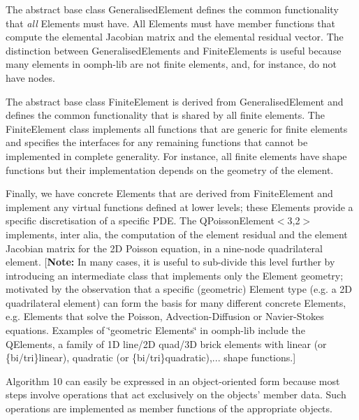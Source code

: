 \begin{DoxyItemize}
\item The abstract base class {\ttfamily Generalised\-Element} defines the common functionality that {\itshape all} Elements must have. All Elements must have member functions that compute the elemental Jacobian matrix and the elemental residual vector. The distinction between {\ttfamily Generalised\-Elements} and {\ttfamily Finite\-Elements} is useful because many elements in {\ttfamily oomph-\/lib} are not finite elements, and, for instance, do not have nodes.
\item The abstract base class {\ttfamily Finite\-Element} is derived from {\ttfamily Generalised\-Element} and defines the common functionality that is shared by all finite elements. The {\ttfamily Finite\-Element} class implements all functions that are generic for finite elements and specifies the interfaces for any remaining functions that cannot be implemented in complete generality. For instance, all finite elements have shape functions but their implementation depends on the geometry of the element.
\item Finally, we have concrete Elements that are derived from {\ttfamily Finite\-Element} and implement any virtual functions defined at lower levels; these Elements provide a specific discretisation of a specific P\-D\-E. The {\ttfamily Q\-Poisson\-Element$<$3,2$>$} implements, inter alia, the computation of the element residual and the element Jacobian matrix for the 2\-D Poisson equation, in a nine-\/node quadrilateral element. \mbox{[}{\bfseries Note\-:} In many cases, it is useful to sub-\/divide this level further by introducing an intermediate class that implements only the Element geometry; motivated by the observation that a specific (geometric) Element type (e.\-g. a 2\-D quadrilateral element) can form the basis for many different concrete Elements, e.\-g. Elements that solve the Poisson, Advection-\/\-Diffusion or Navier-\/\-Stokes equations. Examples of \char`\"{}geometric Elements\char`\"{} in {\ttfamily oomph-\/lib} include the {\ttfamily Q\-Elements}, a family of 1\-D line/2\-D quad/3\-D brick elements with linear (or \{bi/tri\}linear), quadratic (or \{bi/tri\}quadratic),... shape functions.\mbox{]}

Algorithm 10 can easily be expressed in an object-\/oriented form because most steps involve operations that act exclusively on the objects' member data. Such operations are implemented as member functions of the appropriate objects.


\end{DoxyItemize}
